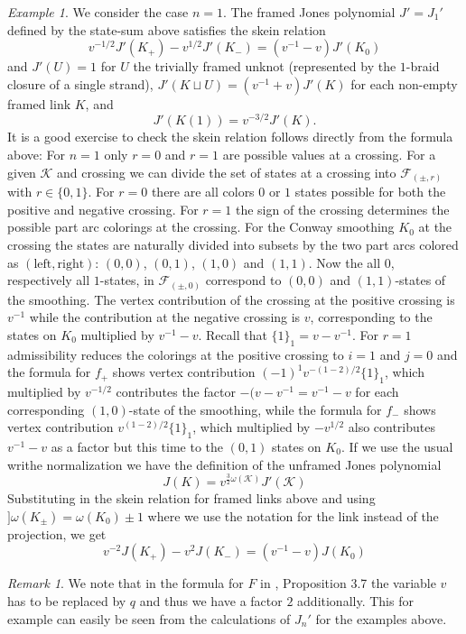 \documentclass[11pt]{article}
\theoremstyle{definition}
\theoremstyle{remark}
\newtheorem*{rem}{Remark}
\theoremstyle{remark}
\newtheorem*{exmp}{Example}
\begin{document}
\begin{exmp} We consider the case $n=1$. The framed Jones polynomial $J'=J_1'$ defined by the state-sum \cite{G} above satisfies the skein relation
$$v^{-1/2}J'(K_+)-v^{1/2}J'(K_-)=(v^{-1}-v)J'(K_0)$$
and $J'(U)=1$ for $U$ the trivially framed unknot (represented by the $1$-braid closure of a single strand), $J'(K\sqcup U)=(v^{-1}+v)J'(K)$ for each non-empty framed link $K$, and 
$$J'(K(1))=v^{-3/2}J'(K).$$
It is a good exercise to check the skein relation follows directly from the formula above: For $n=1$ only $r=0$ and $r=1$ are possible values at a crossing. For a given $\mathcal{K}$ and crossing we can divide the set of states at a crossing into $\mathcal{F}_{(\pm ,r)}$ with $r\in \{0,1\}$. For $r=0$ there are all colors $0$ or $1$ states possible for both the positive and negative crossing. For $r=1$ the sign of the crossing determines the possible part arc colorings at the crossing. For the Conway smoothing $K_0$ at the crossing the states are naturally divided into subsets by the two part arcs colored as $(\textrm{left},\textrm{right})$: $(0,0)$, $(0,1)$, $(1,0)$ and $(1,1)$. Now the all $0$, respectively all $1$-states, in $\mathcal{F}_{(\pm ,0)}$ correspond to $(0,0)$ and $(1,1)$-states of the smoothing. The vertex contribution of the crossing at the positive crossing is $v^{-1}$ while the contribution at the negative crossing is $v$, corresponding to the states on $K_0$ 
multiplied by $v^{-1}-v$. Recall that $\{1\}_1=v-v^{-1}$. For $r=1$ admissibility reduces the colorings at the positive crossing to $i=1$ and $j=0$ and the formula for $f_+$ shows vertex contribution $(-1)^1v^{-(1-2)/2}\{1\}_1$, which multiplied by $v^{-1/2}$ contributes the factor $-(v-v^{-1}=v^{-1}-v$ for each corresponding $(1,0)$-state of the smoothing, while the formula for $f_-$ shows vertex contribution $v^{(1-2)/2}\{1\}_1$, which multiplied by $-v^{1/2}$ 
also contributes $v^{-1}-v$ as a factor but this time to the $(0,1)$ states on $K_0$.
If we use the usual writhe normalization we have the definition of the unframed Jones polynomial
$$J(K)=v^{\frac{3}{2}\omega (\mathcal{K})}J'(\mathcal{K})$$
Substituting in the skein relation for framed links above and using $]\omega (K_{\pm})=\omega (K_0)\pm 1$ where we use the notation for the link instead of the projection, we get
$$v^{-2}J(K_+)-v^2J(K_-)=(v^{-1}-v)J(K_0)$$ 
\end{exmp}

\begin{rem} We note that in the formula for $F$ in \cite{G}, Proposition 3.7 the variable $v$ has to be replaced by $q$ and thus we have a factor $2$ additionally. This for example can easily be seen from the calculations of   $J_n' $ for the examples above. \end{rem}
\end{document}
